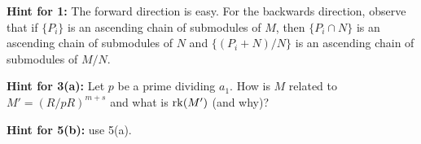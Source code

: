 \documentclass[12pt]{article}
\begin{document}
{\bf Hint for 1:} The forward direction is easy. For the backwards direction,
observe that if $\{P_i\}$ is an ascending chain of submodules of $M$,
then $\{P_i\cap N\}$ is an ascending chain of submodules of $N$
and $\{(P_i+N)/N\}$ is an ascending chain of submodules of $M/N$.

\newpage


{\bf Hint for 3(a):} Let $p$ be a prime
dividing $a_1$. How is $M$ related to $M'=(R/pR)^{m+s}$
and what is ${\rm rk}(M')$ (and why)?

\newpage

{\bf Hint for 5(b):} use 5(a).
\end{document}
